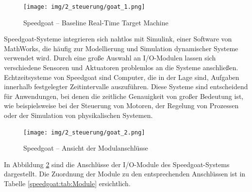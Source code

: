 \pagebreak[1]
\begin{figure}[!ht]
	\begin{center}
		\texttt{[image: img/2\_steuerung/goat\_1.png]}
		\caption{Speedgoat – Baseline Real-Time Target Machine}
		\label{speedgoat:img:steuerung_goat}
	\end{center}
\end{figure}
\pagebreak[1]

Speedgoat-Systeme integrieren sich nahtlos mit Simulink, einer Software von MathWorks, die häufig zur Modellierung und Simulation dynamischer Systeme verwendet wird. Durch eine große Auswahl an I/O-Modulen lassen sich verschiedene Sensoren und Aktuatoren problemlos an die Systeme anschließen.
Echtzeitsysteme von Speedgoat sind Computer, die in der Lage sind, Aufgaben innerhalb festgelegter Zeitintervalle auszuführen. Diese Systeme sind entscheidend für Anwendungen, bei denen die zeitliche Genauigkeit von großer Bedeutung ist, wie beispielsweise bei der Steuerung von Motoren, der Regelung von Prozessen oder der Simulation von physikalischen Systemen.


\pagebreak[1]
\begin{figure}[!ht]
	\begin{center}
		\texttt{[image: img/2\_steuerung/goat\_2.png]}
		\caption{Speedgoat – Ansicht der Modulanschlüsse}
		\label{speedgoat:img:Modulanschlüsse}
	\end{center}
\end{figure}
\pagebreak[1]
In Abbildung \ref{speedgoat:img:Modulanschlüsse} sind die Anschlüsse der I/O-Module des Speedgoat-Systems dargestellt. Die Zuordnung der Module zu den entsprechenden Anschlüssen ist in Tabelle \ref{speedgoat:tab:Module} ersichtlich.

